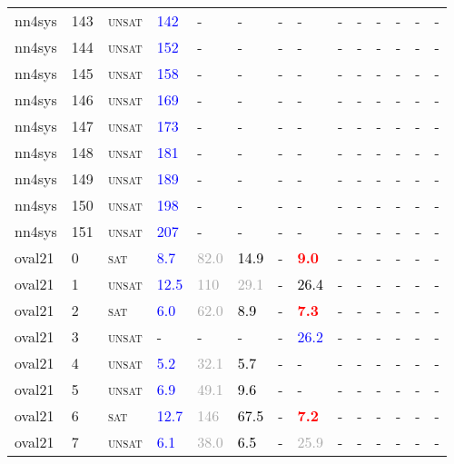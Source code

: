 \begin{center}
{\begin{longtable}{@{}llllllllllllll@{}}
nn4sys & 143 & \textsc{unsat} & \textcolor{blue}{142} & - & - & - & - & - & - & - & - & - & - \\
nn4sys & 144 & \textsc{unsat} & \textcolor{blue}{152} & - & - & - & - & - & - & - & - & - & - \\
nn4sys & 145 & \textsc{unsat} & \textcolor{blue}{158} & - & - & - & - & - & - & - & - & - & - \\
nn4sys & 146 & \textsc{unsat} & \textcolor{blue}{169} & - & - & - & - & - & - & - & - & - & - \\
nn4sys & 147 & \textsc{unsat} & \textcolor{blue}{173} & - & - & - & - & - & - & - & - & - & - \\
nn4sys & 148 & \textsc{unsat} & \textcolor{blue}{181} & - & - & - & - & - & - & - & - & - & - \\
nn4sys & 149 & \textsc{unsat} & \textcolor{blue}{189} & - & - & - & - & - & - & - & - & - & - \\
nn4sys & 150 & \textsc{unsat} & \textcolor{blue}{198} & - & - & - & - & - & - & - & - & - & - \\
nn4sys & 151 & \textsc{unsat} & \textcolor{blue}{207} & - & - & - & - & - & - & - & - & - & - \\
oval21 & 0 & \textsc{sat} & \textcolor{blue}{8.7} & \textcolor{darkgray}{82.0} & \textcolor{black}{14.9} & - & \textbf{\textcolor{red}{9.0}} & - & - & - & - & - & - \\
oval21 & 1 & \textsc{unsat} & \textcolor{blue}{12.5} & \textcolor{darkgray}{110} & \textcolor{darkgray}{29.1} & - & \textcolor{black}{26.4} & - & - & - & - & - & - \\
oval21 & 2 & \textsc{sat} & \textcolor{blue}{6.0} & \textcolor{darkgray}{62.0} & \textcolor{black}{8.9} & - & \textbf{\textcolor{red}{7.3}} & - & - & - & - & - & - \\
oval21 & 3 & \textsc{unsat} & - & - & - & - & \textcolor{blue}{26.2} & - & - & - & - & - & - \\
oval21 & 4 & \textsc{unsat} & \textcolor{blue}{5.2} & \textcolor{darkgray}{32.1} & \textcolor{black}{5.7} & - & - & - & - & - & - & - & - \\
oval21 & 5 & \textsc{unsat} & \textcolor{blue}{6.9} & \textcolor{darkgray}{49.1} & \textcolor{black}{9.6} & - & - & - & - & - & - & - & - \\
oval21 & 6 & \textsc{sat} & \textcolor{blue}{12.7} & \textcolor{darkgray}{146} & \textcolor{black}{67.5} & - & \textbf{\textcolor{red}{7.2}} & - & - & - & - & - & - \\
oval21 & 7 & \textsc{unsat} & \textcolor{blue}{6.1} & \textcolor{darkgray}{38.0} & \textcolor{black}{6.5} & - & \textcolor{darkgray}{25.9} & - & - & - & - & - & - \\

\end{longtable}}
\end{center}
